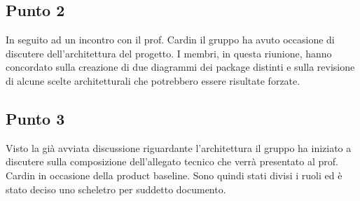     \subsection{Punto 2}
        In seguito ad un incontro con il prof. Cardin il gruppo ha avuto occasione di discutere dell'architettura del progetto. I membri, in questa riunione, hanno concordato sulla creazione di due diagrammi dei package distinti e sulla revisione di alcune scelte architetturali che potrebbero essere risultate forzate.
    \subsection{Punto 3}
        Visto la già avviata discussione riguardante l'architettura il gruppo ha iniziato a discutere sulla composizione dell'allegato tecnico che verrà presentato al prof. Cardin in occasione della product baseline. Sono quindi stati divisi i ruoli ed è stato deciso uno scheletro per suddetto documento.